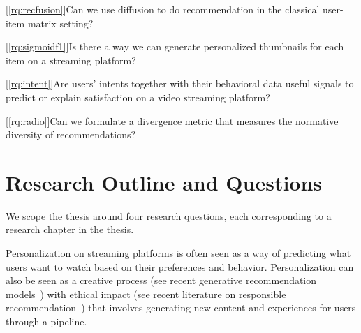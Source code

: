 
[\ref{rq:recfusion}]{Can we use diffusion to do recommendation in the classical user-item matrix setting?}

[\ref{rq:sigmoidf1}]{Is there a way we can generate personalized thumbnails for each item on a streaming platform?}

[\ref{rq:intent}]{Are users' intents together with their behavioral data useful signals to predict or explain satisfaction on a video streaming platform?}

[\ref{rq:radio}]{Can we formulate a divergence metric that measures the normative diversity of recommendations?}

\section{Research Outline and Questions}
\label{section:introduction:rqs}


We scope the thesis around four research questions, each corresponding to a research chapter in the thesis.


Personalization on streaming platforms is often seen as a way of predicting what users want to watch based on their preferences and behavior. Personalization can also be seen as a creative process (see recent generative recommendation models~\cite{llmRecNews, llmRec, genirRec}) with ethical impact (see recent literature on responsible recommendation~\cite{helberger, normalize, fairChatGPTReco}) that involves generating new content and experiences for users through a pipeline. 

\noindent {}

